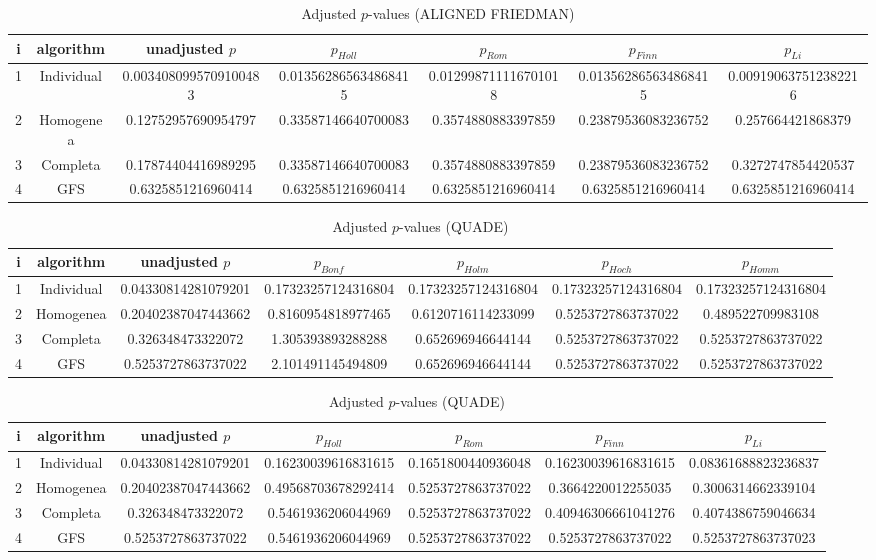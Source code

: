\documentclass[a4paper,10pt]{article}
\begin{document}
\begin{landscape}
\begin{table}[!htp]
\centering\scriptsize
\caption{Adjusted $p$-values (ALIGNED FRIEDMAN)}
\begin{tabular}{ccccccc}
i&algorithm&unadjusted $p$&$p_{Holl}$&$p_{Rom}$&$p_{Finn}$&$p_{Li}$\\
\hline
1&Individual&0.0034080995709100483&0.013562865634868415&0.012998711116701018&0.013562865634868415&0.009190637512382216\\
2&Homogenea&0.12752957690954797&0.33587146640700083&0.3574880883397859&0.23879536083236752&0.257664421868379\\
3&Completa&0.17874404416989295&0.33587146640700083&0.3574880883397859&0.23879536083236752&0.3272747854420537\\
4&GFS&0.6325851216960414&0.6325851216960414&0.6325851216960414&0.6325851216960414&0.6325851216960414\\
\hline
\end{tabular}
\end{table}


\newpage

\begin{table}[!htp]
\centering\scriptsize
\caption{Adjusted $p$-values (QUADE)}
\begin{tabular}{ccccccc}
i&algorithm&unadjusted $p$&$p_{Bonf}$&$p_{Holm}$&$p_{Hoch}$&$p_{Homm}$\\
\hline
1&Individual&0.04330814281079201&0.17323257124316804&0.17323257124316804&0.17323257124316804&0.17323257124316804\\
2&Homogenea&0.20402387047443662&0.8160954818977465&0.6120716114233099&0.5253727863737022&0.489522709983108\\
3&Completa&0.326348473322072&1.305393893288288&0.652696946644144&0.5253727863737022&0.5253727863737022\\
4&GFS&0.5253727863737022&2.101491145494809&0.652696946644144&0.5253727863737022&0.5253727863737022\\
\hline
\end{tabular}
\end{table}

\begin{table}[!htp]
\centering\scriptsize
\caption{Adjusted $p$-values (QUADE)}
\begin{tabular}{ccccccc}
i&algorithm&unadjusted $p$&$p_{Holl}$&$p_{Rom}$&$p_{Finn}$&$p_{Li}$\\
\hline
1&Individual&0.04330814281079201&0.16230039616831615&0.1651800440936048&0.16230039616831615&0.08361688823236837\\
2&Homogenea&0.20402387047443662&0.49568703678292414&0.5253727863737022&0.3664220012255035&0.3006314662339104\\
3&Completa&0.326348473322072&0.5461936206044969&0.5253727863737022&0.40946306661041276&0.4074386759046634\\
4&GFS&0.5253727863737022&0.5461936206044969&0.5253727863737022&0.5253727863737022&0.5253727863737023\\
\hline
\end{tabular}
\end{table}

\end{landscape}
\end{document}
